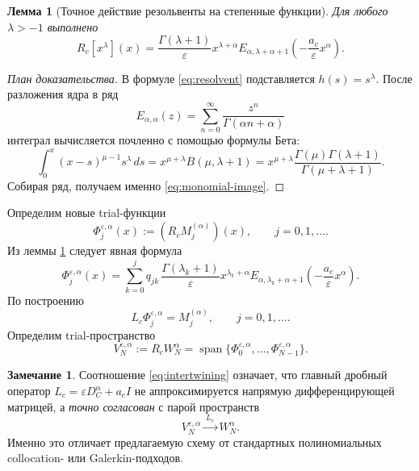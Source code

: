 \documentclass[12pt,a4paper]{article}
\newtheorem{lemma}[theorem]{Лемма}
\theoremstyle{definition}
\newtheorem{remark}[theorem]{Замечание}
\newcommand{\eps}{\varepsilon}
\newcommand{\Dc}{D_C^\alpha}
\newcommand{\Lc}{L_c}
\newcommand{\Rc}{R_c}
\newcommand{\Span}{\operatorname{span}}
\begin{document}
\begin{lemma}[Точное действие резольвенты на степенные функции]
\label{lem:monomial-image}
Для любого $\lambda>-1$ выполнено
\begin{equation}
\label{eq:monomial-image}
\Rc[x^\lambda](x)
=
\frac{\Gamma(\lambda+1)}{\eps}
x^{\lambda+\alpha}
E_{\alpha,\lambda+\alpha+1}\!\left(-\frac{a_c}{\eps}x^\alpha\right).
\end{equation}
\end{lemma}

\begin{proof}[План доказательства]
В формуле \eqref{eq:resolvent} подставляется $h(s)=s^\lambda$.
После разложения ядра в ряд
\[
E_{\alpha,\alpha}(z)=\sum_{n=0}^\infty \frac{z^n}{\Gamma(\alpha n+\alpha)}
\]
интеграл вычисляется почленно с помощью формулы Бета:
\[
\int_0^x (x-s)^{\mu-1}s^\lambda\,ds
=
x^{\mu+\lambda}B(\mu,\lambda+1)
=
x^{\mu+\lambda}\frac{\Gamma(\mu)\Gamma(\lambda+1)}{\Gamma(\mu+\lambda+1)}.
\]
Собирая ряд, получаем именно \eqref{eq:monomial-image}.
\end{proof}

Определим новые trial-функции
\begin{equation}
\label{eq:trial-basis}
\Phi_j^{\eps,\alpha}(x):=(\Rc M_j^{(\alpha)})(x), \qquad j=0,1,\dots.
\end{equation}
Из леммы \ref{lem:monomial-image} следует явная формула
\begin{equation}
\label{eq:Phi-explicit}
\Phi_j^{\eps,\alpha}(x)
=
\sum_{k=0}^j q_{jk}\,
\frac{\Gamma(\lambda_k+1)}{\eps}
x^{\lambda_k+\alpha}
E_{\alpha,\lambda_k+\alpha+1}\!\left(-\frac{a_c}{\eps}x^\alpha\right).
\end{equation}
По построению
\begin{equation}
\label{eq:intertwining}
\Lc \Phi_j^{\eps,\alpha}=M_j^{(\alpha)},\qquad j=0,1,\dots.
\end{equation}
Определим trial-пространство
\begin{equation}
\label{eq:VN}
V_N^{\eps,\alpha}:=\Rc W_N^\alpha
=
\Span\{\Phi_0^{\eps,\alpha},\dots,\Phi_{N-1}^{\eps,\alpha}\}.
\end{equation}

\begin{remark}
Соотношение \eqref{eq:intertwining} означает, что главный дробный оператор
$\Lc=\eps\Dc+a_c I$ не аппроксимируется напрямую дифференцирующей матрицей,
а \emph{точно согласован} с парой пространств
\[
V_N^{\eps,\alpha}\xrightarrow{\ \Lc\ }W_N^\alpha.
\]
Именно это отличает предлагаемую схему от стандартных полиномиальных collocation-
или Galerkin-подходов.
\end{remark}
\end{document}
